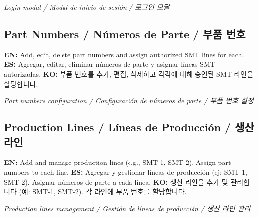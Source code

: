 \documentclass[12pt,a4paper]{article}
\newcommand{\tri}[3]{%
  \textbf{EN:} #1 \quad\textbar\quad \textbf{ES:} #2 \quad\textbar\quad \textbf{KO:} #3%
}
\begin{document}
\begin{photobox}
\centering
\vspace{2.5cm}
\textit{Login modal / Modal de inicio de sesión / 로그인 모달}
\vspace{0.5cm}
\end{photobox}

\subsection{Part Numbers / Números de Parte / 부품 번호}

\tri{Add, edit, delete part numbers and assign authorized SMT lines for each.}
{Agregar, editar, eliminar números de parte y asignar líneas SMT autorizadas.}
{부품 번호를 추가, 편집, 삭제하고 각각에 대해 승인된 SMT 라인을 할당합니다.}

\begin{photobox}
\centering
\vspace{3.5cm}
\textit{Part numbers configuration / Configuración de números de parte / 부품 번호 설정}
\vspace{0.5cm}
\end{photobox}

\subsection{Production Lines / Líneas de Producción / 생산 라인}

\tri{Add and manage production lines (e.g., SMT-1, SMT-2). Assign part numbers to each line.}
{Agregar y gestionar líneas de producción (ej: SMT-1, SMT-2). Asignar números de parte a cada línea.}
{생산 라인을 추가 및 관리합니다 (예: SMT-1, SMT-2). 각 라인에 부품 번호를 할당합니다.}

\begin{photobox}
\centering
\vspace{3cm}
\textit{Production lines management / Gestión de líneas de producción / 생산 라인 관리}
\vspace{0.5cm}
\end{photobox}
\end{document}
